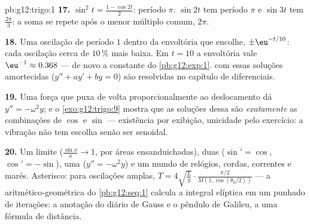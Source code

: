\begin{solution}{pb:g12:trigo:1}
\textbf{17.} $\sin^2 t = \frac{1 - \cos 2t}{2}$: período
$\pi$. $\sin 2t$ tem período $\pi$ e $\sin 3t$ tem
$\frac{2\pi}{3}$: a soma se repete após o menor múltiplo comum,
$2\pi$.

\textbf{18.} Uma oscilação de período $1$ dentro da envoltória
que encolhe, $\pm\eu^{-t/10}$: cada oscilação cerca de
$10\,\%$ mais baixa. Em $t = 10$ a envoltória vale
$\eu^{-1} \approx 0.368$ --- de novo a constante do
\cref{pb:g12:exp:1}.  com essas soluções amortecidas
($y'' + a y' + b y = 0$) são resolvidas no capítulo de 
diferenciais.

\textbf{19.} Uma força que puxa de volta proporcionalmente ao
deslocamento dá $y'' = -\omega^2 y$; e o
\cref{exo:g12:trigo:9} mostra que as soluções dessa  são
\emph{exatamente} as combinações de $\cos$ e $\sin$ ---
existência por exibição, unicidade pelo exercício: a vibração
não tem escolha senão ser senoidal.

\textbf{20.} Um limite ($\frac{\sin x}{x} \to 1$, por áreas
ensanduichadas), duas  ($\sin' = \cos$,
$\cos' = -\sin$), uma  ($y'' = -\omega^2 y$) e um mundo
de relógios, cordas, correntes e marés. Asterisco: para
oscilações amplas, $T = 4\sqrt{\frac Lg} \cdot
\frac{\pi/2}{M(1, \cos(\theta_0/2))}$ --- a 
aritmético-geométrica do \cref{pb:g12:seq:1} calcula a integral
elíptica em um punhado de iterações: a anotação do diário de
Gauss e o pêndulo de Galileu, a uma fórmula de distância.
\end{solution}
